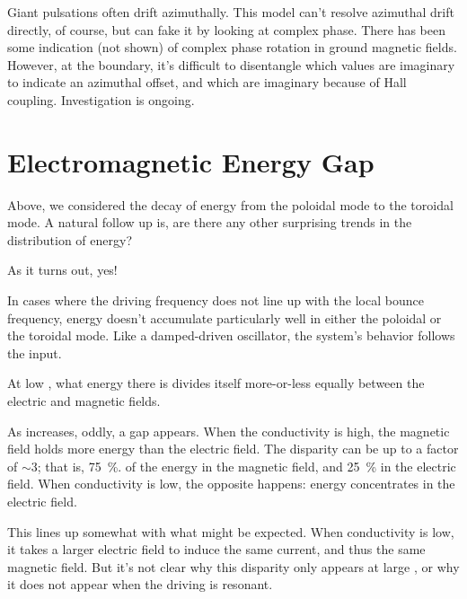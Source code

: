 Giant pulsations often drift azimuthally. This model can't resolve azimuthal drift directly, of course, but can fake it by looking at complex phase. There has been some indication (not shown) of complex phase rotation in ground magnetic fields. However, at the boundary, it's difficult to disentangle which values are imaginary to indicate an azimuthal offset, and which are imaginary because of Hall coupling. Investigation is ongoing. 

\section{Electromagnetic Energy Gap}


Above, we considered the decay of energy from the poloidal mode to the toroidal mode. A natural follow up is, are there any other surprising trends in the distribution of energy?

As it turns out, yes!

In cases where the driving frequency does not line up with the local bounce frequency, energy doesn't accumulate particularly well in either the poloidal or the toroidal mode. Like a damped-driven oscillator, the system's behavior follows the input. 

At low \azm, what energy there is divides itself more-or-less equally between the electric and magnetic fields. 

As \azm increases, oddly, a gap appears. When the conductivity is high, the magnetic field holds more energy than the electric field. The disparity can be up to a factor of $\sim \num{3}$; that is, \SI{75}{\percent}. of the energy in the magnetic field, and \SI{25}{\percent} in the electric field. When conductivity is low, the opposite happens: energy concentrates in the electric field. 

This lines up somewhat with what might be expected. When conductivity is low, it takes a larger electric field to induce the same current, and thus the same magnetic field. But it's not clear why this disparity only appears at large \azm, or why it does not appear when the driving is resonant. 

